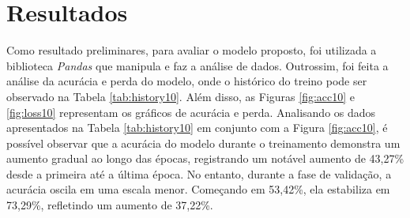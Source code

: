 
\section{\esp Resultados} \label{results}




Como resultado preliminares, para avaliar o modelo proposto, foi utilizada a biblioteca \textit{Pandas} que manipula e faz a análise de dados. Outrossim, foi feita a análise da acurácia e perda do modelo, onde o histórico do treino pode ser observado na Tabela \ref{tab:history10}. Além disso, as Figuras \ref{fig:acc10} e \ref{fig:loss10} representam os gráficos de acurácia e perda. Analisando os dados apresentados na Tabela \ref{tab:history10} em conjunto com a Figura \ref{fig:acc10}, é possível observar que a acurácia do modelo durante o treinamento demonstra um aumento gradual ao longo das épocas, registrando um notável aumento de 43,27\% desde a primeira até a última época. No entanto, durante a fase de validação, a acurácia oscila em uma escala menor. Começando em 53,42\%, ela estabiliza em 73,29\%, refletindo um aumento de 37,22\%. 

